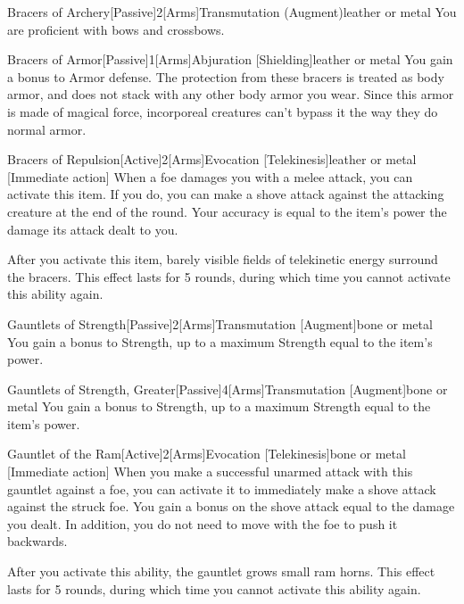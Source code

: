 \begin{magicitemdef}{Bracers of Archery}[Passive]{2}[Arms]{Transmutation (Augment)}{leather or metal}
     You are proficient with bows and crossbows.
\end{magicitemdef}

\begin{magicitemdef}{Bracers of Armor}[Passive]{1}[Arms]{Abjuration [Shielding]}{leather or metal}
     You gain a  bonus to Armor defense.
    The protection from these bracers is treated as body armor, and does not stack with any other body armor you wear.
    Since this armor is made of magical force, incorporeal creatures can't bypass it the way they do normal armor.
\end{magicitemdef}

\begin{magicitemdef}{Bracers of Repulsion}[Active]{2}[Arms]{Evocation [Telekinesis]}{leather or metal}
    [Immediate action] When a foe damages you with a melee attack, you can activate this item.
    If you do, you can make a shove attack against the attacking creature at the end of the round.
    Your accuracy is equal to the item's power \add the damage its attack dealt to you.

    After you activate this item, barely visible fields of telekinetic energy surround the bracers.
    This effect lasts for 5 rounds, during which time you cannot activate this ability again.
\end{magicitemdef}

\begin{magicitemdef}{Gauntlets of Strength}[Passive]{2}[Arms]{Transmutation [Augment]}{bone or metal}
     You gain a  bonus to Strength, up to a maximum Strength equal to the item's power.
\end{magicitemdef}

\begin{magicitemdef}{Gauntlets of Strength, Greater}[Passive]{4}[Arms]{Transmutation [Augment]}{bone or metal}
     You gain a  bonus to Strength, up to a maximum Strength equal to the item's power.
\end{magicitemdef}

\begin{magicitemdef}{Gauntlet of the Ram}[Active]{2}[Arms]{Evocation [Telekinesis]}{bone or metal}
    [Immediate action] When you make a successful unarmed attack with this gauntlet against a foe, you can activate it to immediately make a shove attack against the struck foe.
    You gain a bonus on the shove attack equal to the damage you dealt.
    In addition, you do not need to move with the foe to push it backwards.

    After you activate this ability, the gauntlet grows small ram horns.
    This effect lasts for 5 rounds, during which time you cannot activate this ability again.
\end{magicitemdef}


